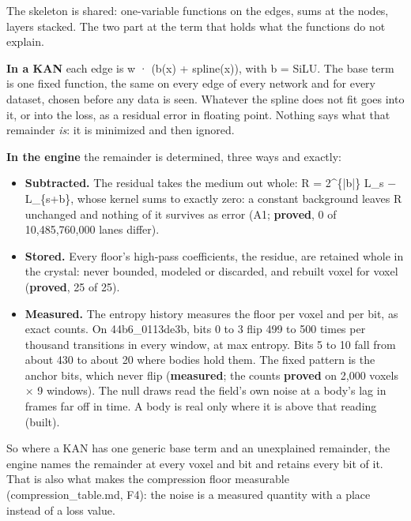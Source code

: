 The skeleton is shared: one-variable functions on the edges, sums at the nodes, layers stacked. The two part at the term that holds what the functions do not explain.

\textbf{In a KAN} each edge is w · (b(x) + spline(x)), with b = SiLU. The base term is one fixed function, the same on every edge of every network and for every dataset, chosen before any data is seen. Whatever the spline does not fit goes into it, or into the loss, as a residual error in floating point. Nothing says what that remainder \emph{is}: it is minimized and then ignored.

\textbf{In the engine} the remainder is determined, three ways and exactly:

\begin{itemize}
\item \textbf{Subtracted.} The residual takes the medium out whole: R = 2\textasciicircum{}\{|b|\} L\_\allowbreak{}s − L\_\allowbreak{}\{s+b\}, whose kernel sums to exactly zero: a constant background leaves R unchanged and nothing of it survives as error (A1; \textbf{proved}, 0 of 10,485,760,000 lanes differ).
\item \textbf{Stored.} Every floor's high-pass coefficients, the residue, are retained whole in the crystal: never bounded, modeled or discarded, and rebuilt voxel for voxel (\textbf{proved}, 25 of 25).
\item \textbf{Measured.} The entropy history measures the floor per voxel and per bit, as exact counts. On 44b6\_\allowbreak{}0113de3b, bits 0 to 3 flip 499 to 500 times per thousand transitions in every window, at max entropy. Bits 5 to 10 fall from about 430 to about 20 where bodies hold them. The fixed pattern is the anchor bits, which never flip (\textbf{measured}; the counts \textbf{proved} on 2,000 voxels × 9 windows). The null draws read the field's own noise at a body's lag in frames far off in time. A body is real only where it is above that reading (built).
\end{itemize}

So where a KAN has one generic base term and an unexplained remainder, the engine names the remainder at every voxel and bit and retains every bit of it. That is also what makes the compression floor measurable (compression\_\allowbreak{}table.md, F4): the noise is a measured quantity with a place instead of a loss value.

